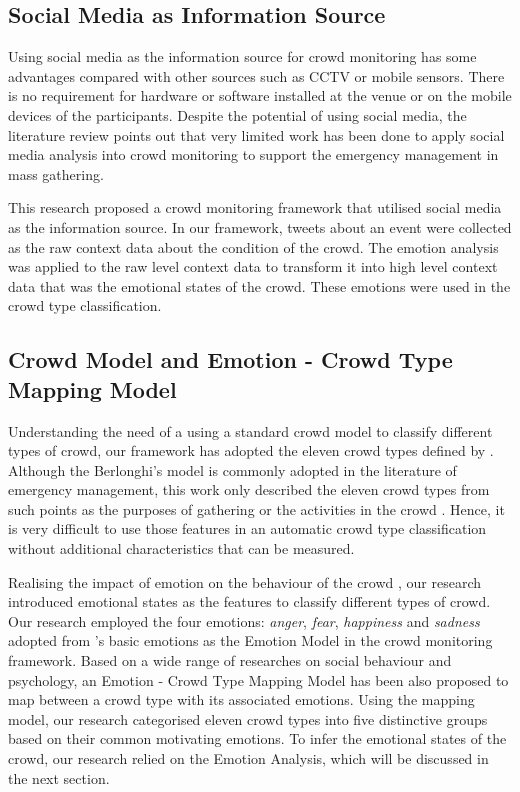 \subsection{Social Media as Information Source}
Using social media as the information source for crowd monitoring has some advantages compared with other sources such as CCTV or mobile sensors. There is no requirement for hardware or software installed at the venue or on the mobile devices of the participants. Despite the potential of using social media, the literature review points out that very limited work has been done to apply social media analysis into crowd monitoring to support the emergency management in mass gathering.

This research proposed a crowd monitoring framework that utilised social media as the information source. In our framework, tweets about an event were collected as the raw context data about the condition of the crowd. The emotion analysis was applied to the raw level context data to transform it into high level context data that was the emotional states of the crowd. These emotions were used in the crowd type classification.

\subsection{Crowd Model and Emotion - Crowd Type Mapping Model}
Understanding the need of a using a standard crowd model to classify different types of crowd, our framework has adopted the eleven crowd types defined by \citet{Berlonghi1995}. Although the Berlonghi's model is commonly adopted in the literature of emergency management, this work only described the eleven crowd types from such points as the purposes of gathering or the activities in the crowd \citep{Zeitz2009}. Hence, it is very difficult to use those features in an automatic crowd type classification without additional characteristics that can be measured.

Realising the impact of emotion on the behaviour of the crowd \citep{Kornblum2011}, our research introduced emotional states as the features to classify different types of crowd. Our research employed the four emotions: \textit{anger}, \textit{fear}, \textit{happiness} and \textit{sadness} adopted from \citet{ekman1971constants}'s basic emotions as the Emotion Model in the crowd monitoring framework. Based on a wide range of researches on social behaviour and psychology, an Emotion - Crowd Type Mapping Model has been also proposed to map between a crowd type with its associated emotions. Using the mapping model, our research categorised eleven crowd types into five distinctive groups based on their common motivating emotions. To infer the emotional states of the crowd, our research relied on the Emotion Analysis, which will be discussed in the next section.

